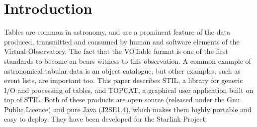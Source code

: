 \documentclass[11pt,twoside]{article}  %
\begin{document}
%
%

\section{Introduction}

Tables are common in astronomy, and are a
prominent feature of the data produced, transmitted and consumed by
human and software elements of the Virtual Observatory.
The fact that the VOTable format is one of the first standards to become an 
bears witness to this observation.
A common example of astronomical tabular data is an object catalogue, 
but other examples, such as event lists, are important too.
This paper describes STIL, a library for generic I/O and processing of
tables, and TOPCAT, a graphical user application built on top of STIL.
Both of these products are open source 
(released under the Gnu Public Licence) and pure Java (J2SE1.4),
which makes them highly portable and easy to deploy.
They have been developed for the Starlink Project.
\end{document}
